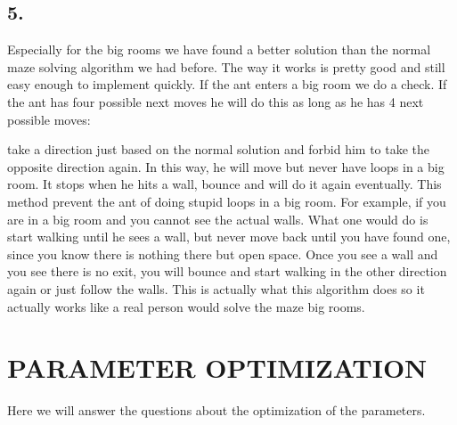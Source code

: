 \documentclass{scrartcl}
\begin{document}
\subsection*{5.}
Especially for the big rooms we have found a better solution than the normal maze solving algorithm we had before. The way it works is pretty good and still easy enough to implement quickly. If the ant enters a big room we do a check. If the ant has four possible next moves he will do this as long as he has 4 next possible moves:\par
take a direction just based on the normal solution and forbid him to take the opposite direction again.
In this way, he will move but never have loops in a big room. It stops when he hits a wall, bounce and will do it again eventually. This method prevent the ant of doing stupid loops in a big room. For example, if you are in a big room and you cannot see the actual walls. What one would do is start walking until he sees a wall, but never move back until you have found one, since you know there is nothing there but open space. Once you see a wall and you see there is no exit, you will bounce and start walking in the other direction again or just follow the walls. This is actually what this algorithm does so it actually works like a real person would solve the maze big rooms.
\pagebreak

\section*{PARAMETER OPTIMIZATION}
Here we will answer the questions about the optimization of the parameters.
\end{document}
